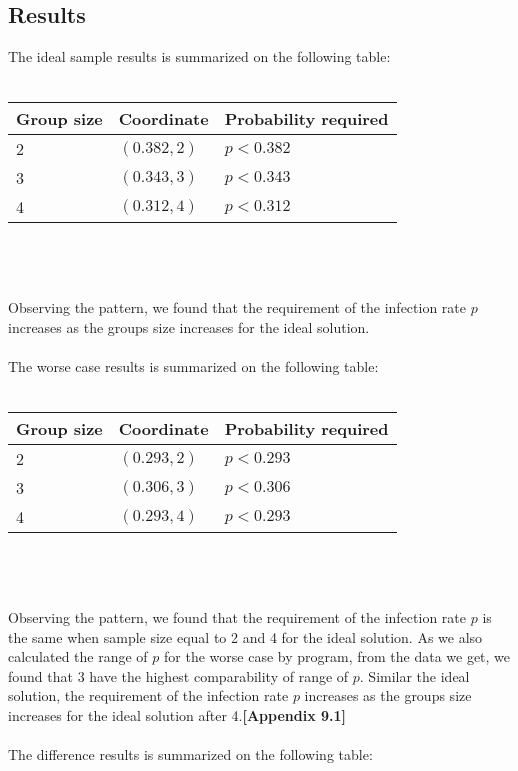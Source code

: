 \subsection{Results}
The ideal sample results is summarized on the following table:
\\
\\
\begin{tabular}{p{5.25cm}p{5.25cm}p{6cm}}
\toprule
\textbf{Group size}&\textbf{Coordinate}&\textbf{Probability required}\\
\toprule
2&$(0.382,2)$&$p<0.382$\\
\midrule
3&$(0.343,3)$&$p<0.343$\\
\midrule
4&$(0.312,4)$&$p<0.312$\\
\bottomrule
\end{tabular}
\\
\\
\\
Observing the pattern, we found that the requirement of the infection rate $p$ increases as the groups size increases for the ideal solution.
\\
\\
The worse case results is summarized on the following table:
\\
\\
\begin{tabular}{p{5.25cm}p{5.25cm}p{6cm}}
\toprule
\textbf{Group size}&\textbf{Coordinate}&\textbf{Probability required}\\
\toprule
2&$(0.293,2)$&$p<0.293$\\
\midrule
3&$(0.306,3)$&$p<0.306$\\
\midrule
4&$(0.293,4)$&$p<0.293$\\
\bottomrule
\end{tabular}
\\
\\
\\
Observing the pattern, we found that the requirement of the infection rate $p$ is the same when sample size equal to 2 and 4 for the ideal solution. As we also calculated the range of $p$ for the worse case by program, from the data we get, we found that 3 have the highest comparability of range of $p$. Similar the ideal solution, the requirement of the infection rate $p$ increases as the groups size increases for the ideal solution after 4.\textbf{[Appendix 9.1]}
\\
\\
The difference results is summarized on the following table:
\\

